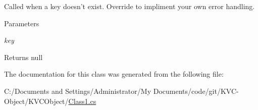 Called when a key doesn't exist. Override to impliment your own error handling. 
\begin{DoxyParams}{Parameters}
\item[{\em key}]\end{DoxyParams}
\begin{DoxyReturn}{Returns}
null
\end{DoxyReturn}


The documentation for this class was generated from the following file:\begin{DoxyCompactItemize}
\item 
C:/Documents and Settings/Administrator/My Documents/code/git/KVC-\/Object/KVCObject/\hyperlink{_class1_8cs}{Class1.cs}\end{DoxyCompactItemize}
